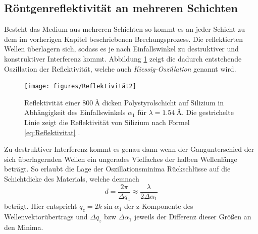 \subsection*{Röntgenreflektivität an mehreren Schichten}
Besteht das Medium aus mehreren Schichten so kommt es an jeder Schicht zu dem im vorherigen Kapitel beschriebenen Brechungsprozess.
Die reflektierten Wellen überlagern sich, sodass es je nach Einfallswinkel zu destruktiver und konstruktiver Interferenz kommt.
Abbildung \ref{fig:tfig3} zeigt die dadurch entstehende Oszillation der Reflektivität, welche auch \textit{Kiessig-Oszillation} genannt wird.
\begin{figure}[H]
\centering
\texttt{[image: figures/Reflektivität2]}
\caption{Reflektivität einer $\SI{800}{\angstrom}$ dicken Polystyrolschicht auf Silizium in Abhängigkeit des Einfallswinkels $\alpha_1$ für $\lambda = \SI{1,54}{\angstrom}$.
Die gestrichelte Linie zeigt die Reflektivität von Silizium nach Formel \eqref{eq:Reflektivitat} \cite{skript}.}
\label{fig:tfig3}
\end{figure}
Zu destruktiver Interferenz kommt es genau dann wenn der Gangunterschied der sich überlagernden Wellen ein ungerades Vielfaches der halben Wellenlänge beträgt.
So erlaubt die Lage der Oszillationsminima Rückschlüsse auf die Schichtdicke des Materials, welche demnach
\begin{equation}
    d = \frac{2\pi}{\Delta q_z}\approx \frac{\lambda}{2\Delta \alpha_1}
    \label{eq:kiessig}
\end{equation}
beträgt.
Hier entspricht $q_z=2k\sin{\alpha_1}$ der z-Komponente des Wellenvektorübertrags und $\Delta q_z$ bzw $\Delta \alpha_1$ jeweils der Differenz dieser Größen an den Minima.

